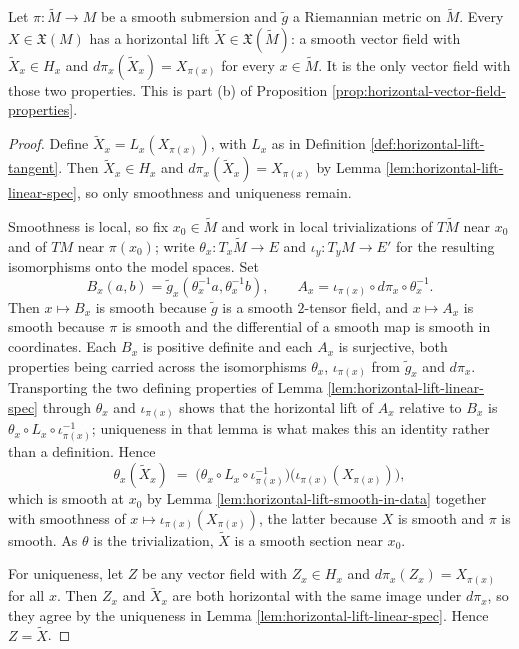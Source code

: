 \begin{proposition}
\label{prop:horizontal-lift-of-vector-field}
\leanok
{}
Let $\pi : \tilde{M} \to M$ be a smooth submersion and $\tilde{g}$ a Riemannian metric on $\tilde{M}$. Every $X \in \mathfrak{X}(M)$ has a horizontal lift $\tilde{X} \in \mathfrak{X}(\tilde{M})$: a smooth vector field with $\tilde{X}_x \in H_x$ and $d\pi_x(\tilde{X}_x) = X_{\pi(x)}$ for every $x \in \tilde{M}$. It is the only vector field with those two properties. This is part (b) of Proposition \ref{prop:horizontal-vector-field-properties}.
\end{proposition}

\begin{proof}
\leanok
{}
Define $\tilde{X}_x = L_x(X_{\pi(x)})$, with $L_x$ as in Definition \ref{def:horizontal-lift-tangent}. Then $\tilde{X}_x \in H_x$ and $d\pi_x(\tilde{X}_x) = X_{\pi(x)}$ by Lemma \ref{lem:horizontal-lift-linear-spec}, so only smoothness and uniqueness remain.

Smoothness is local, so fix $x_0 \in \tilde{M}$ and work in local trivializations of $T\tilde{M}$ near $x_0$ and of $TM$ near $\pi(x_0)$; write $\theta_x : T_x\tilde{M} \to E$ and $\iota_y : T_yM \to E'$ for the resulting isomorphisms onto the model spaces. Set
\[
B_x(a,b) = \tilde{g}_x(\theta_x^{-1}a, \theta_x^{-1}b), \qquad A_x = \iota_{\pi(x)} \circ d\pi_x \circ \theta_x^{-1} .
\]
Then $x \mapsto B_x$ is smooth because $\tilde{g}$ is a smooth $2$-tensor field, and $x \mapsto A_x$ is smooth because $\pi$ is smooth and the differential of a smooth map is smooth in coordinates. Each $B_x$ is positive definite and each $A_x$ is surjective, both properties being carried across the isomorphisms $\theta_x$, $\iota_{\pi(x)}$ from $\tilde{g}_x$ and $d\pi_x$. Transporting the two defining properties of Lemma \ref{lem:horizontal-lift-linear-spec} through $\theta_x$ and $\iota_{\pi(x)}$ shows that the horizontal lift of $A_x$ relative to $B_x$ is $\theta_x \circ L_x \circ \iota_{\pi(x)}^{-1}$; uniqueness in that lemma is what makes this an identity rather than a definition. Hence
\[
\theta_x(\tilde{X}_x) \;=\; \bigl(\theta_x \circ L_x \circ \iota_{\pi(x)}^{-1}\bigr)\bigl(\iota_{\pi(x)}(X_{\pi(x)})\bigr),
\]
which is smooth at $x_0$ by Lemma \ref{lem:horizontal-lift-smooth-in-data} together with smoothness of $x \mapsto \iota_{\pi(x)}(X_{\pi(x)})$, the latter because $X$ is smooth and $\pi$ is smooth. As $\theta$ is the trivialization, $\tilde{X}$ is a smooth section near $x_0$.

For uniqueness, let $Z$ be any vector field with $Z_x \in H_x$ and $d\pi_x(Z_x) = X_{\pi(x)}$ for all $x$. Then $Z_x$ and $\tilde{X}_x$ are both horizontal with the same image under $d\pi_x$, so they agree by the uniqueness in Lemma \ref{lem:horizontal-lift-linear-spec}. Hence $Z = \tilde{X}$.
\end{proof}

